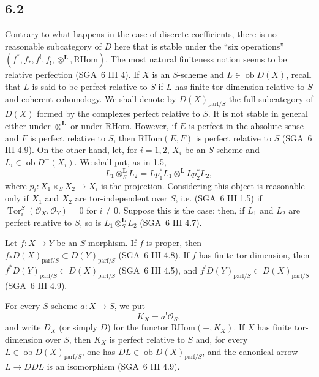 \documentclass[11pt]{article}
\providecommand{\cO}{\mathcal{O}}
\DeclareMathOperator{\Tor}{Tor}
\providecommand{\RHom}{\mathrm{RHom}}
\begin{document}
\subsection*{6.2}
Contrary to what happens in the case of discrete coefficients, there is no reasonable subcategory of $D$ here that is stable under the ``six operations'' $(f^*,f_*,f^!,f_!,\otimes^{\mathbf L},\RHom)$. The most natural finiteness notion seems to be relative perfection (SGA~6 III 4). If $X$ is an $S$-scheme and $L\in\operatorname{ob}D(X)$, recall that $L$ is said to be perfect relative to $S$ if $L$ has finite tor-dimension relative to $S$ and coherent cohomology. We shall denote by $D(X)_{\mathrm{parf}/S}$ the full subcategory of $D(X)$ formed by the complexes perfect relative to $S$. It is not stable in general either under $\otimes^{\mathbf L}$ or under $\RHom$. However, if $E$ is perfect in the absolute sense and $F$ is perfect relative to $S$, then $\RHom(E,F)$ is perfect relative to $S$ (SGA~6 III 4.9). On the other hand, let, for $i=1,2$, $X_i$ be an $S$-scheme and $L_i\in\operatorname{ob}D^{-}(X_i)$. We shall put, as in 1.5,
\[
L_1\otimes_S^{\mathbf L}L_2=Lp_1^*L_1\otimes^{\mathbf L}Lp_2^*L_2,
\]
where $p_i:X_1\times_SX_2\to X_i$ is the projection. Considering this object is reasonable only if $X_1$ and $X_2$ are tor-independent over $S$, i.e. (SGA~6 III 1.5) if $\Tor_i^S(\cO_X,\cO_Y)=0$ for $i\ne0$. Suppose this is the case: then, if $L_1$ and $L_2$ are perfect relative to $S$, so is $L_1\otimes_S^{\mathbf L}L_2$ (SGA~6 III 4.7).

Let $f:X\to Y$ be an $S$-morphism. If $f$ is proper, then $f_*D(X)_{\mathrm{parf}/S}\subset D(Y)_{\mathrm{parf}/S}$ (SGA~6 III 4.8). If $f$ has finite tor-dimension, then $f^*D(Y)_{\mathrm{parf}/S}\subset D(X)_{\mathrm{parf}/S}$ (SGA~6 III 4.5), and $f^!D(Y)_{\mathrm{parf}/S}\subset D(X)_{\mathrm{parf}/S}$ (SGA~6 III 4.9).

For every $S$-scheme $a:X\to S$, we put
\begin{equation}
\tag{6.2.1}
K_X=a^!\cO_S,
\end{equation}
and write $D_X$ (or simply $D$) for the functor $\RHom(-,K_X)$. If $X$ has finite tor-dimension over $S$, then $K_X$ is perfect relative to $S$ and, for every $L\in\operatorname{ob}D(X)_{\mathrm{parf}/S}$, one has $DL\in\operatorname{ob}D(X)_{\mathrm{parf}/S}$, and the canonical arrow $L\to DDL$ is an isomorphism (SGA~6 III 4.9).
\end{document}
